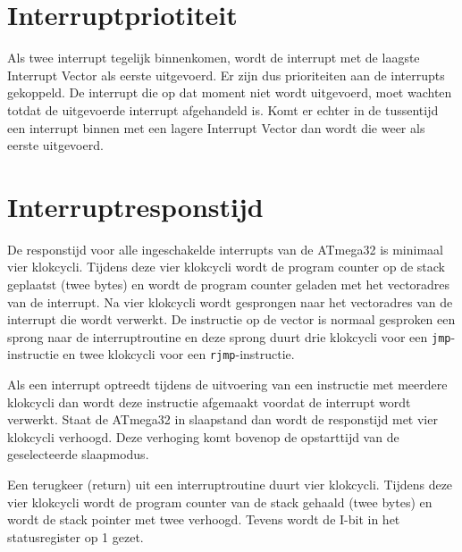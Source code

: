 \section{Interruptpriotiteit}
Als twee interrupt tegelijk binnenkomen, wordt de interrupt met de laagste
Interrupt Vector als eerste uitgevoerd. Er zijn dus prioriteiten aan de
interrupts gekoppeld. De interrupt die op dat moment niet wordt uitgevoerd,
moet wachten totdat de uitgevoerde interrupt afgehandeld is. Komt er echter
in de tussentijd een interrupt binnen met een lagere Interrupt Vector
dan wordt die weer als eerste uitgevoerd.


\section{Interruptresponstijd}
De responstijd voor alle ingeschakelde interrupts van de ATmega32 is minimaal
vier klokcycli. Tijdens deze vier klokcycli wordt de program counter op de
stack geplaatst (twee bytes) en wordt de program counter geladen met het
vectoradres van de interrupt. Na vier klokcycli wordt gesprongen naar het
vectoradres van de interrupt die wordt verwerkt. De instructie op de vector
is normaal gesproken een sprong naar de interruptroutine en deze sprong duurt
drie klokcycli voor een \lstinline|jmp|-instructie en twee klokcycli voor een
\lstinline|rjmp|-instructie.

Als een interrupt optreedt tijdens de uitvoering van een instructie met
meerdere klokcycli dan wordt deze instructie afgemaakt voordat de interrupt
wordt verwerkt. Staat de ATmega32 in slaapstand dan wordt de responstijd met
vier klokcycli verhoogd. Deze verhoging komt bovenop de opstarttijd van de
geselecteerde slaapmodus.

Een terugkeer (return) uit een interruptroutine duurt vier klokcycli. Tijdens
deze vier klokcycli wordt de program counter van de stack gehaald (twee bytes)
en wordt de stack pointer met twee verhoogd. Tevens wordt de I-bit in het
statusregister op 1 gezet.


